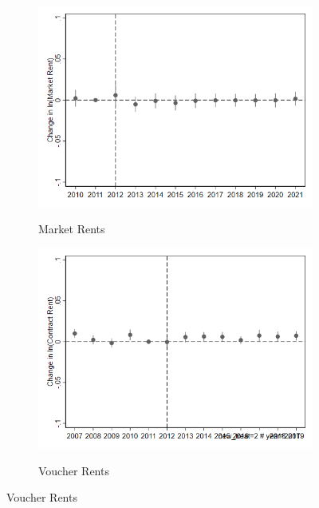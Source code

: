 \documentclass[12pt]{article}
\begin{document}
{{{{{{\begin{figure}[h!]
\begin{center}
\caption{Rental Impacts of Randomly Split Comparison Group}
\begin{subfigure}[b]{0.4\textwidth}
\caption{Market Rents}
\includegraphics[scale = 0.41]{Robustness/R10 Street Easy Control Robust.png}
\label{fig:mktrobust}
\end{subfigure}
\hfill
\begin{subfigure}[b]{0.4\textwidth}
\caption{Voucher Rents}
\includegraphics[scale = 0.41]{Robustness/R9 High Surge Voucher Rents_all vouchers_control robustness.png}
\label{fig:vouchrobust}
\end{subfigure}
\end{center}
\end{figure}


}}}}}}
\end{document}

